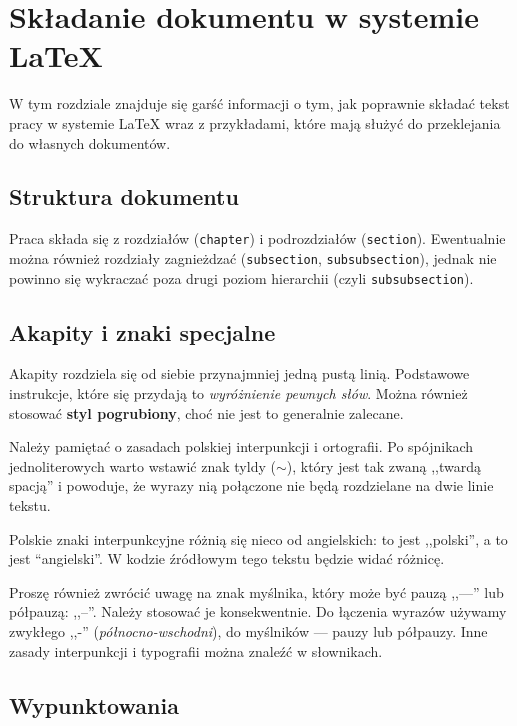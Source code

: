
\chapter{Składanie dokumentu w systemie \LaTeX}

W tym rozdziale znajduje się
garść informacji o tym, jak poprawnie składać tekst pracy w systemie \LaTeX{} wraz z 
przykładami, które mają służyć do przeklejania do własnych dokumentów.

\section{Struktura dokumentu}

Praca składa się z rozdziałów (\texttt{chapter}) i podrozdziałów (\texttt{section}).
Ewentualnie można również rozdziały zagnieżdzać (\texttt{subsection}, \texttt{subsubsection}),
jednak nie powinno się wykraczać poza drugi poziom hierarchii (czyli \texttt{subsubsection}).

\section{Akapity i znaki specjalne}

Akapity rozdziela się od siebie przynajmniej jedną pustą linią. Podstawowe
instrukcje, które się przydają to \emph{wyróżnienie pewnych słów}. Można również
stosować \textbf{styl pogrubiony}, choć nie jest to generalnie zalecane.

Należy pamiętać o zasadach polskiej interpunkcji i ortografii. Po spójnikach 
jednoliterowych warto wstawić znak tyldy ($\sim$), który jest tak zwaną
,,twardą spacją'' i powoduje, że wyrazy nią połączone nie będą rozdzielane
na dwie linie tekstu.

Polskie znaki interpunkcyjne różnią się nieco od angielskich: to jest ,,polski'', a to jest
``angielski''. W kodzie źródłowym tego tekstu będzie widać różnicę.

Proszę również zwrócić uwagę na znak myślnika, który może być pauzą ,,---'' lub
półpauzą: ,,--''. Należy stosować je konsekwentnie. Do łączenia wyrazów używamy
zwykłego ,,-'' (\emph{północno-wschodni}), do myślników --- pauzy lub półpauzy.
Inne zasady interpunkcji i typografii można znaleźć w słownikach.

\section{Wypunktowania}

